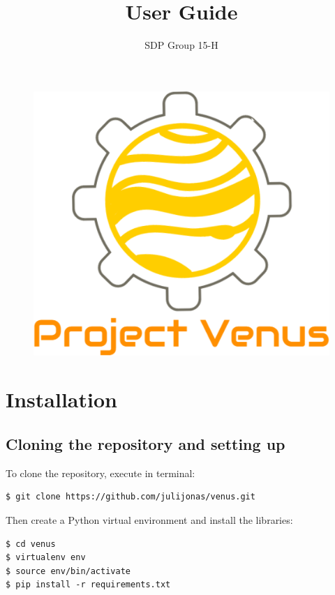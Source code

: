 \documentclass[12pt]{article}
\title{User Guide}
\author{SDP Group 15-H}
\begin{document}
\begin{figure}
    \vspace*{-3em}
    \centering
    \includegraphics[scale=.18]{logo.png}
\end{figure}

\setlength{\droptitle}{-4em}
\maketitle

\section{Installation}

\subsection{Cloning the repository and setting up}

To clone the repository, execute in terminal:
\begin{lstlisting}
$ git clone https://github.com/julijonas/venus.git
\end{lstlisting}

Then create a Python virtual environment and install the libraries:
\begin{lstlisting}
$ cd venus
$ virtualenv env
$ source env/bin/activate
$ pip install -r requirements.txt
\end{lstlisting}
\end{document}
